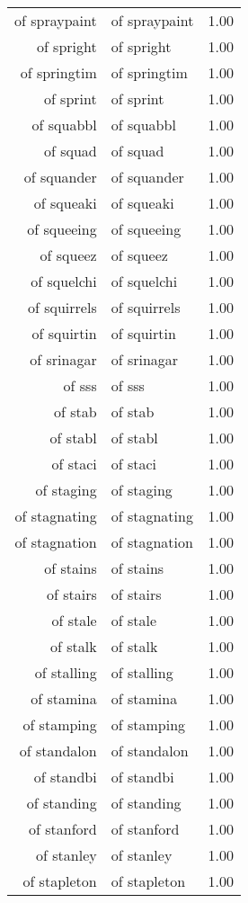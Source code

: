 \begin{table}[ht]
\begin{tabular}{rlr}
  of spraypaint & of spraypaint & 1.00 \\ 
  of spright & of spright & 1.00 \\ 
  of springtim & of springtim & 1.00 \\ 
  of sprint & of sprint & 1.00 \\ 
  of squabbl & of squabbl & 1.00 \\ 
  of squad & of squad & 1.00 \\ 
  of squander & of squander & 1.00 \\ 
  of squeaki & of squeaki & 1.00 \\ 
  of squeeing & of squeeing & 1.00 \\ 
  of squeez & of squeez & 1.00 \\ 
  of squelchi & of squelchi & 1.00 \\ 
  of squirrels & of squirrels & 1.00 \\ 
  of squirtin & of squirtin & 1.00 \\ 
  of srinagar & of srinagar & 1.00 \\ 
  of sss & of sss & 1.00 \\ 
  of stab & of stab & 1.00 \\ 
  of stabl & of stabl & 1.00 \\ 
  of staci & of staci & 1.00 \\ 
  of staging & of staging & 1.00 \\ 
  of stagnating & of stagnating & 1.00 \\ 
  of stagnation & of stagnation & 1.00 \\ 
  of stains & of stains & 1.00 \\ 
  of stairs & of stairs & 1.00 \\ 
  of stale & of stale & 1.00 \\ 
  of stalk & of stalk & 1.00 \\ 
  of stalling & of stalling & 1.00 \\ 
  of stamina & of stamina & 1.00 \\ 
  of stamping & of stamping & 1.00 \\ 
  of standalon & of standalon & 1.00 \\ 
  of standbi & of standbi & 1.00 \\ 
  of standing & of standing & 1.00 \\ 
  of stanford & of stanford & 1.00 \\ 
  of stanley & of stanley & 1.00 \\ 
  of stapleton & of stapleton & 1.00 \\ 

\end{tabular}
\end{table}
